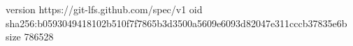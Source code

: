 version https://git-lfs.github.com/spec/v1
oid sha256:b0593049418102b510f7f7865b3d3500a5609e6093d82047e311cccb37835e6b
size 786528
